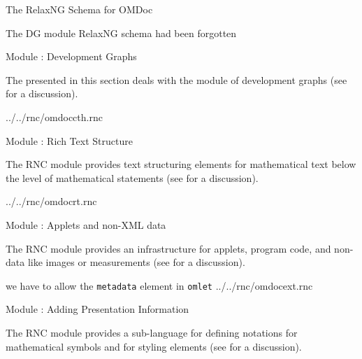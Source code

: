 \begin{tchapter}[id=rnc]{The RelaxNG Schema for OMDoc}
\begin{erratum}[reported-by=Kristina Sojakova,date=2007-07-10]{The DG module RelaxNG
    schema had been forgotten}
\begin{tsection}[id=rnc:dg]{Module {}: Development Graphs}

  The {} presented in this section deals with the module
  {} of development graphs (see {} for a discussion).

 {../../rnc/omdoccth.rnc}
\end{tsection}
\end{erratum}

\begin{tsection}[id=rnc:RT]{Module {}: Rich Text Structure}

  The RNC module {} provides text structuring elements for
  mathematical text below the level of mathematical statements (see
  {} for a discussion).

 
  {../../rnc/omdocrt.rnc}
\end{tsection}

\begin{tsection}[id=rnc:ext]{Module {}: Applets and non-XML data}

  The RNC module {} provides an infrastructure for applets, program
  code, and non-{\xml} data like images or measurements (see {} for
  a discussion).

\begin{erratum}[reported-by=Michael Kohlhase,date=2008-01-23]{we have to allow the
    {\tt{metadata}} element in {\tt{omlet}}}
 {../../rnc/omdocext.rnc}
\end{erratum}
\end{tsection}

\begin{tsection}[id=rnc:pres]{Module {}: Adding Presentation Information}

The RNC module {} provides a sub-language for defining notations
for mathematical symbols and for styling {\omdoc} elements (see
  {} for a discussion).


\end{tsection}
\end{tchapter}
